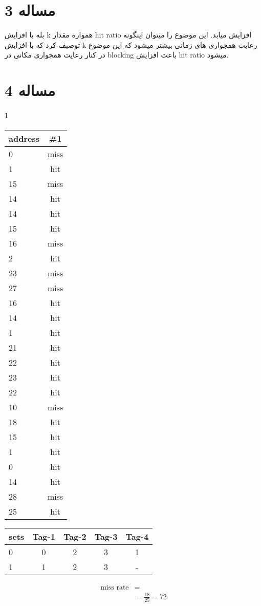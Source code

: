 \documentclass[11pt]{article}
\begin{document}
\section{مساله 3}
بله با افزایش k همواره مقدار hit ratio افزایش میابد. این موضوع را میتوان اینگونه توصیف کرد که با افزایش k رعایت همجواری های زمانی بیشتر میشود که این موضوع در کنار رعایت همجواری مکانی در blocking باعث افزایش hit ratio میشود.
\section{مساله 4}
\paragraph{1}
\begin{center}
	\begin{tabular}{l || c}
		address & \#1 \\
		\hline
		0  & miss \\
		1  & hit  \\
		15 & miss \\
		14 & hit  \\
		14 & hit  \\
		15 & hit  \\
		16 & miss \\
		2  & hit  \\
		23 & miss \\
		27 & miss \\
		16 & hit  \\
		14 & hit  \\
		1  & hit  \\
		21 & hit  \\
		22 & hit  \\
		23 & hit  \\
		22 & hit  \\
		10 & miss \\
		18 & hit  \\
		15 & hit  \\
		1  & hit  \\
		0  & hit  \\
		14 & hit  \\
		28 & miss \\
		25 & hit  \\
	\end{tabular}
	\begin{tabular}{l || c | c | c | c}
		sets & Tag-1 & Tag-2 & Tag-3 & Tag-4 \\
		\hline
		0 & 0 & 2 & 3 & 1 \\
		1 & 1 & 2 & 3 & - \\
	\end{tabular}
	\begin{align*}
		\text{miss rate} &= \\
		&= \frac{18}{25} = 72%
	\end{align*}
\end{center}
\end{document}
